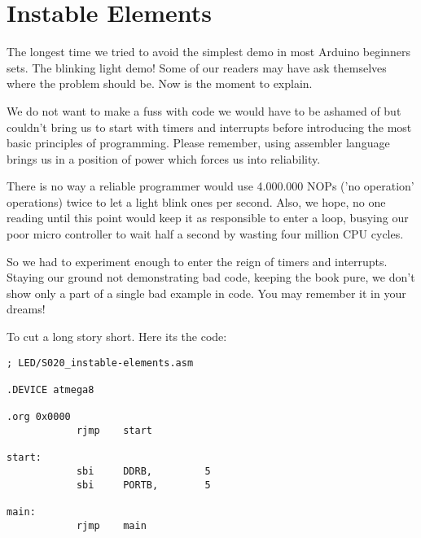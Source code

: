 \section{Instable Elements}

The longest time we tried to avoid the simplest demo in most Arduino beginners sets. The blinking light demo! Some of our readers may have ask themselves where the problem should be. Now is the moment to explain.

We do not want to make a fuss with code we would have to be ashamed of but couldn't bring us to start with timers and interrupts before introducing the most basic principles of programming. Please remember, using assembler language brings us in a position of power which forces us into reliability.

There is no way a reliable programmer would use 4.000.000 NOPs ('no operation' operations) twice to let a light blink ones per second. Also, we hope, no one reading until this point would keep it as responsible to enter a loop, busying our poor micro controller to wait half a second by wasting four million CPU cycles.

So we had to experiment enough to enter the reign of timers and interrupts. Staying our ground not demonstrating bad code, keeping the book pure, we don't show only a part of a single bad example in code. You may remember it in your dreams!

To cut a long story short. Here its the code:

\begin{lstlisting}
; LED/S020_instable-elements.asm

.DEVICE atmega8

.org 0x0000
            rjmp    start 

start:
            sbi     DDRB,         5
            sbi     PORTB,        5
            
main:
            rjmp    main
\end{lstlisting}
